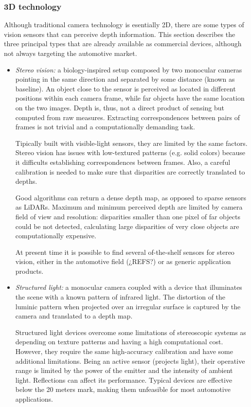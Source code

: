 \subsubsection{3D technology}
Although traditional camera technology is esentially 2D, there are some
types of vision sensors that can perceive depth information. This section
describes the three principal types that are already available as commercial
devices, although not always targeting the automotive market.


\begin{itemize}
    \item \emph{Stereo vision:} a biology-inspired setup composed by two 
    monocular cameras pointing in the same direction and separated by some
    distance (known as baseline). An object close to the sensor is perceived as
    located in different positions within each camera frame, while far objects
    have the same location on the two images. Depth is, thus, not a direct
    product of sensing but computed from raw measures. Extracting 
    correspondences between pairs of frames is not trivial and a 
    computationally demanding task.
    
    Tipically built with visible-light sensors, they are limited by the same
    factors. Stereo vision has issues with low-textured patterns (e.g. solid
    colors) because it difficults establishing correspondences between frames.
    Also, a careful calibration is needed to make sure that disparities are
    correctly translated to depths.
    
    Good algorithms can return a dense depth map, as opposed to sparse 
    sensors as LiDARs. Maximum and minimum perceived depth are limited by
    camera field of view and resolution: disparities smaller than one pixel
    of far objects could be not detected, calculating large disparities of very 
    close objects are computationally expensive.
    
    At present time it is possible to find several of-the-shelf sensors for 
    stereo vision, either in the automotive field (¿REFS?) or as generic
    application products.
    
    \item \emph{Structured light:} a monocular camera coupled with a device that
    illuminates the scene with a known pattern of infrared light. 
    The distortion of the luminic pattern when projected over an irregular 
    surface is captured by the camera and translated to a depth map.
    
    Structured light devices overcome some limitations of stereoscopic systems
    as depending on texture patterns and having a high computational cost. 
    However, they require the same high-accuracy calibration \cite{Garbat2013}
    and have some additional limitations. 
    Being an active sensor (projects light), their 
    operative range is limited by the power of the emitter and the intensity of
    ambient light. Reflections can affect its performance. Typical devices are 
    effective below the 20 meters mark, making them unfeasible for most 
    automotive applications.
    

\end{itemize}
